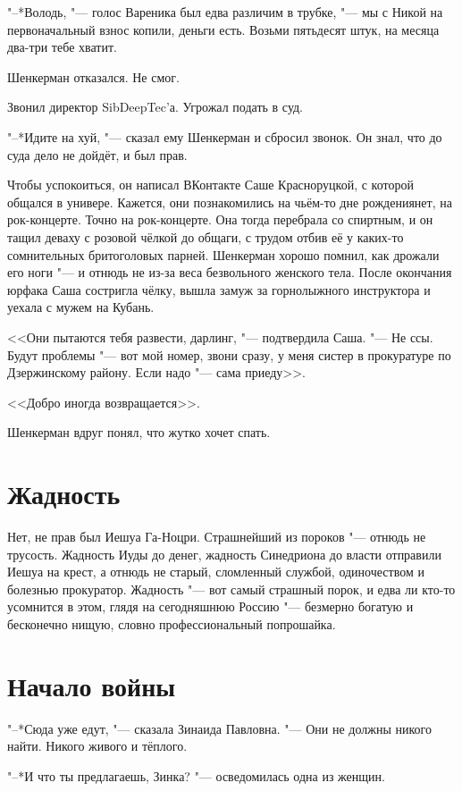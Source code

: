 "--*Володь, "--- голос Вареника был едва различим в трубке, "--- мы с Никой на первоначальный взнос копили, деньги есть.
Возьми пятьдесят штук, на месяца два-три тебе хватит.

Шенкерман отказался.
Не смог.

Звонил директор SibDeepTec'а.
Угрожал подать в суд.

"--*Идите на хуй, "--- сказал ему Шенкерман и сбросил звонок.
Он знал, что до суда дело не дойдёт, и был прав.

Чтобы успокоиться, он написал ВКонтакте Саше Красноруцкой, с которой общался в универе.
Кажется, они познакомились на чьём-то дне рождения\ldotst нет, на рок-концерте.
Точно на рок-концерте.
Она тогда перебрала со спиртным, и он тащил деваху с розовой чёлкой до общаги, с трудом отбив её у каких-то сомнительных бритоголовых парней.
Шенкерман хорошо помнил, как дрожали его ноги "--- и отнюдь не из-за веса безвольного женского тела.
После окончания юрфака Саша состригла чёлку, вышла замуж за горнолыжного инструктора и уехала с мужем на Кубань.

<<Они пытаются тебя развести, дарлинг, "--- подтвердила Саша.
"--- Не ссы.
Будут проблемы "--- вот мой номер, звони сразу, у меня систер в прокуратуре по Дзержинскому району.
Если надо "--- сама приеду>>.

<<Добро иногда возвращается>>.

Шенкерман вдруг понял, что жутко хочет спать.

\section{Жадность}

Нет, не прав был Иешуа Га-Ноцри.
Страшнейший из пороков "--- отнюдь не трусость. 
Жадность Иуды до денег, жадность Синедриона до власти отправили Иешуа на крест, а отнюдь не старый, сломленный службой, одиночеством и болезнью прокуратор.
Жадность "--- вот самый страшный порок, и едва ли кто-то усомнится в этом, глядя на сегодняшнюю Россию "--- безмерно богатую и бесконечно нищую, словно профессиональный попрошайка.

\section{Начало войны}

"--*Сюда уже едут, "--- сказала Зинаида Павловна.
"--- Они не должны никого найти.
Никого живого и тёплого.

"--*И что ты предлагаешь, Зинка? "--- осведомилась одна из женщин.

